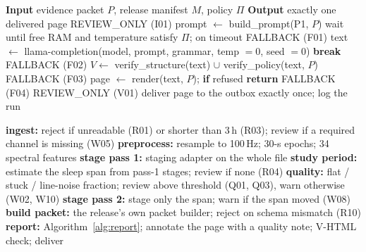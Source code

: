 \begin{algorithm}[htbp]
\caption{Verified report generation for one night (Path A)}\label{alg:report}
\begin{algorithmic}[1]
\State \textbf{Input} evidence packet $P$, release manifest $M$, policy $\Pi$
\State \textbf{Output} exactly one delivered page
 \Return REVIEW\_ONLY (I01) \EndIf
\State prompt $\gets$ build\_prompt(P1, $P$)
\State wait until free RAM and temperature satisfy $\Pi$; on timeout \Return FALLBACK (F01)
  \State text $\gets$ llama-completion(model, prompt, grammar, temp $=0$, seed $=0$)
   \textbf{break} \EndIf
\EndFor
{} \Return FALLBACK (F02) \EndIf
\State $V \gets$ verify\_structure(text) $\cup$ verify\_policy(text, $P$)
 \Return FALLBACK (F03)  \EndIf
\State page $\gets$ render(text, $P$); \textbf{if} refused \textbf{return} FALLBACK (F04)
 \Return REVIEW\_ONLY (V01) \EndIf
\State deliver page to the outbox exactly once; log the run
\end{algorithmic}
\end{algorithm}

\begin{algorithm}[htbp]
\caption{Agentic Path B: raw EDF, no expert hypnogram}\label{alg:pathb}
\begin{algorithmic}[1]
\State \textbf{ingest:} reject if unreadable (R01) or shorter than 3\,h (R03); review if a required channel is missing (W05)
\State \textbf{preprocess:} resample to 100\,Hz; 30-s epochs; 34 spectral features
\State \textbf{stage pass 1:} staging adapter on the whole file
\State \textbf{study period:} estimate the sleep span from pass-1 stages; review if none (R04)
\State \textbf{quality:} flat / stuck / line-noise fraction; review above threshold (Q01, Q03), warn otherwise (W02, W10)
\State \textbf{stage pass 2:} stage only the span; warn if the span moved (W08)
\State \textbf{build packet:} the release's own packet builder; reject on schema mismatch (R10)
\State \textbf{report:} Algorithm~\ref{alg:report}; annotate the page with a quality note; V-HTML check; deliver
\end{algorithmic}
\end{algorithm}

